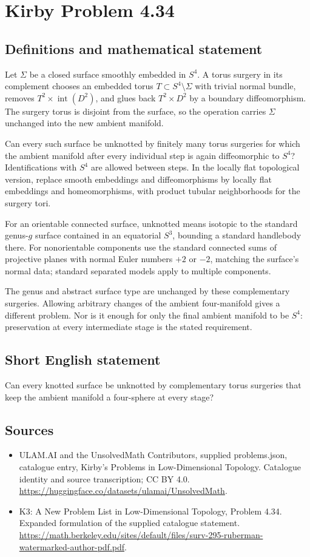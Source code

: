\documentclass[11pt,a4paper]{article}
\begin{document}
\section*{Kirby Problem 4.34}\label{statement}

\subsection{Definitions and mathematical statement}
Let $\Sigma$ be a closed surface smoothly embedded in $S^4$. A torus surgery in its complement chooses an embedded torus $T\subset S^4\setminus\Sigma$ with trivial normal bundle, removes $T^2\times\operatorname{int}(D^2)$, and glues back $T^2\times D^2$ by a boundary diffeomorphism. The surgery torus is disjoint from the surface, so the operation carries $\Sigma$ unchanged into the new ambient manifold.

Can every such surface be unknotted by finitely many torus surgeries for which the ambient manifold after every individual step is again diffeomorphic to $S^4$? Identifications with $S^4$ are allowed between steps. In the locally flat topological version, replace smooth embeddings and diffeomorphisms by locally flat embeddings and homeomorphisms, with product tubular neighborhoods for the surgery tori.

For an orientable connected surface, unknotted means isotopic to the standard genus-$g$ surface contained in an equatorial $S^3$, bounding a standard handlebody there. For nonorientable components use the standard connected sums of projective planes with normal Euler numbers $+2$ or $-2$, matching the surface's normal data; standard separated models apply to multiple components.

The genus and abstract surface type are unchanged by these complementary surgeries. Allowing arbitrary changes of the ambient four-manifold gives a different problem. Nor is it enough for only the final ambient manifold to be $S^4$: preservation at every intermediate stage is the stated requirement.
\subsection{Short English statement}
Can every knotted surface be unknotted by complementary torus surgeries that keep the ambient manifold a four-sphere at every stage?
\subsection{Sources}
\begin{itemize}
\item[S1] ULAM.AI and the UnsolvedMath Contributors, supplied problems.json, catalogue entry, Kirby's Problems in Low-Dimensional Topology. Catalogue identity and source transcription; CC BY 4.0.
\url{https://huggingface.co/datasets/ulamai/UnsolvedMath}.
\item[S2] K3: A New Problem List in Low-Dimensional Topology, Problem 4.34. Expanded formulation of the supplied catalogue statement.
\url{https://math.berkeley.edu/sites/default/files/surv-295-ruberman-watermarked-author-pdf.pdf}.
\end{itemize}
\end{document}
